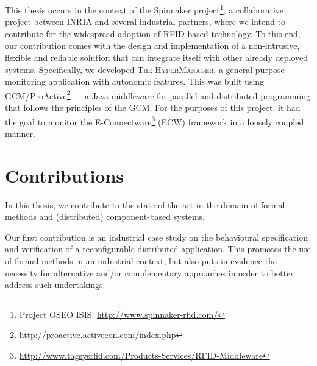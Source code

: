 	This thesis occurs in the context of the Spinnaker project\footnote{Project OSEO ISIS. \url{http://www.spinnaker-rfid.com/}}, 
	a collaborative project between INRIA and several industrial partners, where we intend to contribute for the widespread
	adoption of \ac{RFID}-based technology. To this end, our contribution comes with the design and implementation
	of a non-intrusive, flexible and reliable solution that can integrate itself with other already deployed
	systems.	Specifically, we developed \textsc{The HyperManager}, a general purpose monitoring
	application with autonomic features. This was built using GCM/ProActive\footnote{\url{http://proactive.activeeon.com/index.php}} --- a Java middleware for parallel
	and distributed programming that follows the principles of the \ac{GCM}. For the purposes
	of this project, it had the goal to monitor the \textsf{E-Connectware}\footnote{\url{http://www.tagsysrfid.com/Products-Services/RFID-Middleware}}  
	(\textsf{ECW}) framework in a loosely coupled manner.





	


\section{Contributions}
\label{sec:contrib}

	
		In this thesis, we contribute to the state of the art in the domain
	of formal methods and (distributed) component-based systems.
		
	Our first contribution is an industrial
	case study on the behavioural specification and verification of a reconfigurable
	distributed application. This promotes the use of formal methods in an industrial context,
	but also puts in evidence the necessity for alternative and/or complementary approaches 
	in order to better address such undertakings.		
		

